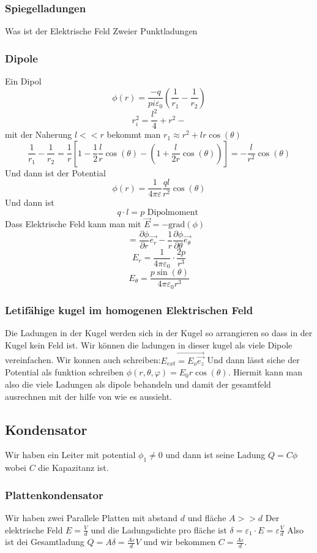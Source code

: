 \documentclass{article}
\begin{document}
\subsubsection{Spiegelladungen} Was ist der Elektrische Feld Zweier Punktladungen
\subsubsection{Dipole} Ein Dipol
\[\phi(r)=\frac{-q}{pi\varepsilon_0} \left(\frac{1}{r_1}-\frac{1}{r_2}\right)\]
\[r_i^2=\frac{l^2}{4}+r^2-\]
mit der Naherung $l<<r$ bekommt man $r_1\approx r^2+l r \cos(\theta)$
\[\frac{1}{r_1}-\frac{1}{r_2}=\frac{1}{r}\left[1-\frac{1}{2}\frac{l}{r}\cos(\theta)- \left(1+\frac{l}{2r}\cos(\theta)\right)\right]=-\frac{l}{r^2}\cos(\theta)\]
Und dann ist der Potential \[\phi(r)=\frac{1}{4\pi\varepsilon}\frac{ql}{r^2}\cos(\theta)\]
Und dann ist \[q\cdot l=p\text{ Dipolmoment }\]
Dass Elektrische Feld kann man mit $\vec{E}=-\text{grad}(\phi)$\[=\frac{\partial \phi}{\partial r}\vec{e_r}-\frac{1}{r}\frac{\partial\phi}{\partial \theta}\vec{e_\theta}\]
\[E_r=\frac{1}{4\pi \varepsilon_0}\cdot \frac{2p}{r^3}\]
\[E_\theta=\frac{p\sin(\theta)}{4\pi\varepsilon_0 r^3}\]
\subsubsection{Letifähige kugel im homogenen Elektrischen Feld} Die Ladungen in der Kugel werden sich in der Kugel so arrangieren so dass in der Kugel kein Feld ist. 
Wir können die ladungen in dieser kugel als viele Dipole vereinfachen. Wir konnen auch schreiben:$\vec{E_{ext}=E_o\vec{e_z}}$ Und dann lässt siche der Potential als funktion schreiben $\phi(r,\theta, \varphi)=E_0r\cos(\theta)$. Hiermit kann man also 
die viele Ladungen als dipole behandeln und damit der gesamtfeld ausrechnen mit der hilfe von wie es aussieht.
\subsection{Kondensator} Wir haben ein Leiter mit potential $\phi_1\neq0$ und dann ist seine Ladung $Q=C\phi$ wobei $C$ die Kapazitanz ist.
\subsubsection{Plattenkondensator} Wir haben zwei Parallele Platten mit abstand $d$ und fläche $A>>d$ Der elektrische Feld $E=\frac{V}{d}$ und die Ladungsdichte pro fläche ist $\delta =\varepsilon_1\cdot E=\varepsilon\frac{V}{d}$
Also ist dei Gesamtladung $Q=A\delta=\frac{A\varepsilon}{d}V$ und wir bekommen $C=\frac{A\varepsilon}{d}$.
\end{document}

